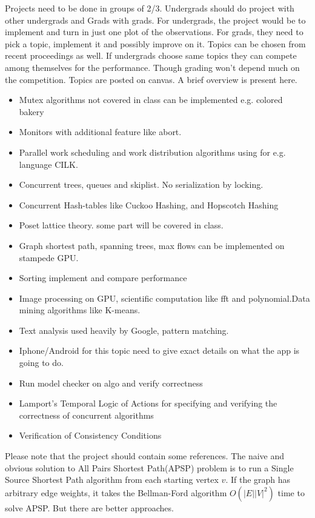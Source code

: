 \documentclass[twoside]{article}
\begin{document}
Projects need to be done in groups of 2/3. Undergrads should do project with other undergrads and Grads with grads. For undergrads, the project would be to implement and turn in just one plot of the observations. For grads, they need to pick a topic, implement it and possibly improve on it. Topics can be chosen from recent proceedings as well.
If undergrads choose same topics they can compete among themselves for the performance. Though grading won't depend much on the competition.
Topics are posted on canvas. A brief overview is present here.
\begin{itemize}
\item Mutex algorithms not covered in class can be implemented e.g. colored bakery
\item Monitors with additional feature like abort.
\item Parallel work scheduling and work distribution algorithms using for e.g. language CILK.
\item Concurrent trees, queues and skiplist. No serialization by locking.
\item Concurrent Hash-tables like Cuckoo Hashing, and Hopscotch Hashing
\item Poset lattice theory. some part will be covered in class.
\item Graph shortest path, spanning trees, max flows can be implemented on stampede GPU.
\item Sorting implement and compare performance
\item Image processing on GPU, scientific computation like fft and polynomial.Data mining algorithms like K-means.
\item Text analysis used heavily by Google, pattern matching.
\item Iphone/Android for this topic need to give exact details on what the app is going to do.
\item Run model checker on algo and verify correctness
\item Lamport's Temporal Logic of Actions for specifying and verifying the correctness of concurrent algorithms
\item Verification of Consistency Conditions
\end{itemize}
Please note that the project should contain some references.  
The naive and obvious solution to All Pairs Shortest Path(APSP) problem is to
run a Single Source Shortest Path algorithm from each starting vertex
$v$.  If the graph has arbitrary edge weights, it takes the Bellman-Ford
algorithm $O(|E||V|^2)$ time to solve APSP.  But there
are better approaches.
\end{document}
